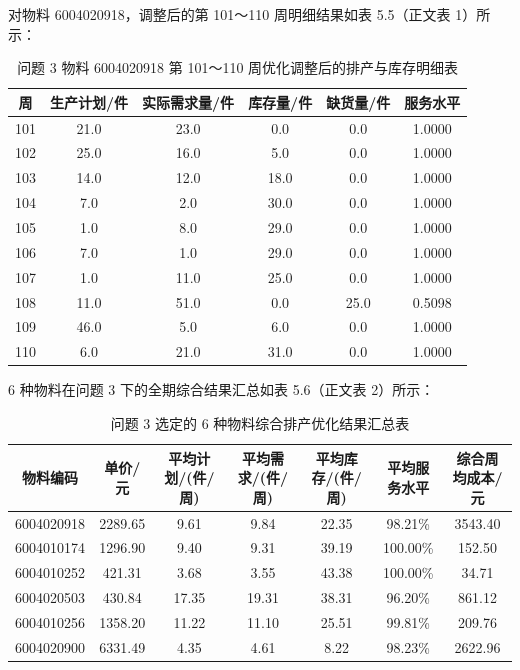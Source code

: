 对物料 6004020918，调整后的第 101～110 周明细结果如表 5.5（正文表
1）所示：

\begin{table}[H]
\centering
\caption{问题 3 物料 6004020918 第 101～110 周优化调整后的排产与库存明细表}
\label{tab:q3_table1}
\begin{tabular}{cccccc}
\toprule
\textbf{周} & \textbf{生产计划/件} & \textbf{实际需求量/件} & \textbf{库存量/件} & \textbf{缺货量/件} & \textbf{服务水平} \\
\midrule
101 & 21.0 & 23.0 & 0.0 & 0.0 & 1.0000 \\
102 & 25.0 & 16.0 & 5.0 & 0.0 & 1.0000 \\
103 & 14.0 & 12.0 & 18.0 & 0.0 & 1.0000 \\
104 & 7.0 & 2.0 & 30.0 & 0.0 & 1.0000 \\
105 & 1.0 & 8.0 & 29.0 & 0.0 & 1.0000 \\
106 & 7.0 & 1.0 & 29.0 & 0.0 & 1.0000 \\
107 & 1.0 & 11.0 & 25.0 & 0.0 & 1.0000 \\
108 & 11.0 & 51.0 & 0.0 & 25.0 & 0.5098 \\
109 & 46.0 & 5.0 & 6.0 & 0.0 & 1.0000 \\
110 & 6.0 & 21.0 & 31.0 & 0.0 & 1.0000 \\
\bottomrule
\end{tabular}
\end{table}

6 种物料在问题 3 下的全期综合结果汇总如表 5.6（正文表 2）所示：

\begin{table}[H]
\centering
\caption{问题 3 选定的 6 种物料综合排产优化结果汇总表}
\label{tab:q3_table2}
\begin{tabular}{ccccccc}
\toprule
\textbf{物料编码} & \textbf{单价/元} & \textbf{平均计划/(件/周)} & \textbf{平均需求/(件/周)} & \textbf{平均库存/(件/周)} & \textbf{平均服务水平} & \textbf{综合周均成本/元} \\
\midrule
6004020918 & 2289.65 & 9.61 & 9.84 & 22.35 & 98.21\% & 3543.40 \\
6004010174 & 1296.90 & 9.40 & 9.31 & 39.19 & 100.00\% & 152.50 \\
6004010252 & 421.31 & 3.68 & 3.55 & 43.38 & 100.00\% & 34.71 \\
6004020503 & 430.84 & 17.35 & 19.31 & 38.31 & 96.20\% & 861.12 \\
6004010256 & 1358.20 & 11.22 & 11.10 & 25.51 & 99.81\% & 209.76 \\
6004020900 & 6331.49 & 4.35 & 4.61 & 8.22 & 98.23\% & 2622.96 \\
\bottomrule
\end{tabular}
\end{table}

